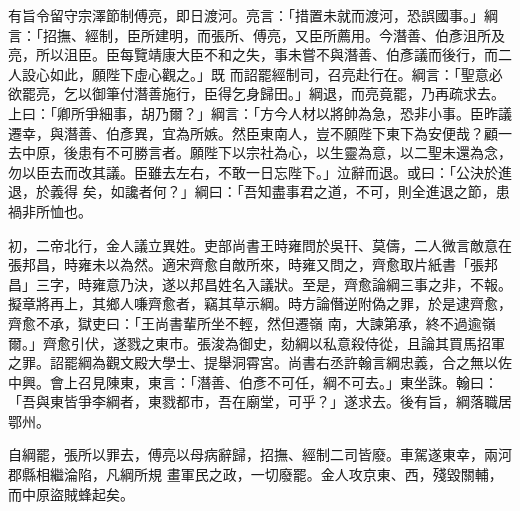\begin{pinyinscope}
 有旨令留守宗澤節制傅亮，即日渡河。亮言：「措置未就而渡河，恐誤國事。」綱言：「招撫、經制，臣所建明，而張所、傅亮，又臣所薦用。今潛善、伯彥沮所及亮，所以沮臣。臣每覽靖康大臣不和之失，事未嘗不與潛善、伯彥議而後行，而二人設心如此，願陛下虛心觀之。」既
 而詔罷經制司，召亮赴行在。綱言：「聖意必欲罷亮，乞以御筆付潛善施行，臣得乞身歸田。」綱退，而亮竟罷，乃再疏求去。上曰：「卿所爭細事，胡乃爾？」綱言：「方今人材以將帥為急，恐非小事。臣昨議遷幸，與潛善、伯彥異，宜為所嫉。然臣東南人，豈不願陛下東下為安便哉？顧一去中原，後患有不可勝言者。願陛下以宗社為心，以生靈為意，以二聖未還為念，勿以臣去而改其議。臣雖去左右，不敢一日忘陛下。」泣辭而退。或曰：「公決於進退，於義得
 矣，如讒者何？」綱曰：「吾知盡事君之道，不可，則全進退之節，患禍非所恤也。



 初，二帝北行，金人議立異姓。吏部尚書王時雍問於吳幵、莫儔，二人微言敵意在張邦昌，時雍未以為然。適宋齊愈自敵所來，時雍又問之，齊愈取片紙書「張邦昌」三字，時雍意乃決，遂以邦昌姓名入議狀。至是，齊愈論綱三事之非，不報。擬章將再上，其鄉人嗛齊愈者，竊其草示綱。時方論僭逆附偽之罪，於是逮齊愈，齊愈不承，獄吏曰：「王尚書輩所坐不輕，然但遷嶺
 南，大諫第承，終不過逾嶺爾。」齊愈引伏，遂戮之東市。張浚為御史，劾綱以私意殺侍從，且論其買馬招軍之罪。詔罷綱為觀文殿大學士、提舉洞霄宮。尚書右丞許翰言綱忠義，合之無以佐中興。會上召見陳東，東言：「潛善、伯彥不可任，綱不可去。」東坐誅。翰曰：「吾與東皆爭李綱者，東戮都市，吾在廟堂，可乎？」遂求去。後有旨，綱落職居鄂州。



 自綱罷，張所以罪去，傅亮以母病辭歸，招撫、經制二司皆廢。車駕遂東幸，兩河郡縣相繼淪陷，凡綱所規
 畫軍民之政，一切廢罷。金人攻京東、西，殘毀關輔，而中原盜賊蜂起矣。



\end{pinyinscope}